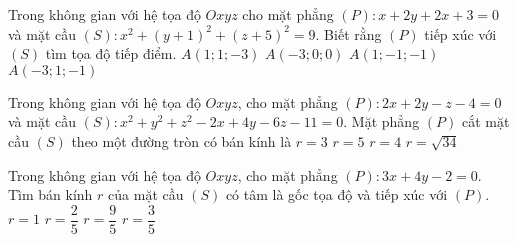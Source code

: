 \begin{ex}%
	Trong không gian với hệ tọa độ $Oxyz$ cho mặt phẳng $(P)\colon x+2y+2x+3=0$ và mặt cầu $(S)\colon x^2+(y+1)^2+(z+5)^2=9$. Biết rằng $(P)$ tiếp xúc với $(S)$ tìm tọa độ tiếp điểm.
	\choice
	{\True $A(1;1;-3)$}
	{$A(-3;0;0)$}
	{$A(1;-1;-1)$}
	{$A(-3;1;-1)$}
\end{ex}
\begin{ex}%
	Trong không gian với hệ tọa độ $Oxyz$, cho mặt phẳng $(P)\colon 2x+2y-z-4=0$ và mặt cầu $(S)\colon x^2+y^2+z^2-2x+4y-6z-11=0$. Mặt phẳng $(P)$ cắt mặt cầu $(S)$ theo một đường tròn có bán kính là
	\choice
	{$r=3$}
	{$r=5$}
	{\True $r=4$}
	{$r=\sqrt{34}$}
\end{ex}
\begin{ex}%
	Trong không gian với hệ tọa độ $Oxyz$, cho mặt phẳng $(P)\colon 3x+4y-2=0$. Tìm bán kính $r$ của mặt cầu $(S)$ có tâm là gốc tọa độ và tiếp xúc với $(P)$.
	\choice
	{$r=1$}
	{\True $r=\dfrac{2}{5}$}
	{$r=\dfrac{9}{5}$}
	{$r=\dfrac{3}{5}$}
\end{ex}


